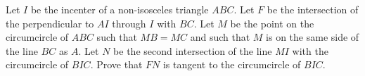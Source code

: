 Let $I$ be the incenter of a non-isosceles triangle $ABC$.
Let $F$ be the intersection of the perpendicular to $AI$ through $I$ with $BC$.
Let $M$ be the point on the circumcircle of $ABC$ such that $MB=MC$
and such that $M$ is on the same side of the line $BC$ as $A$.
Let $N$ be the second intersection of the line $MI$ with the circumcircle of $BIC$.
Prove that $FN$ is tangent to the circumcircle of $BIC$.
